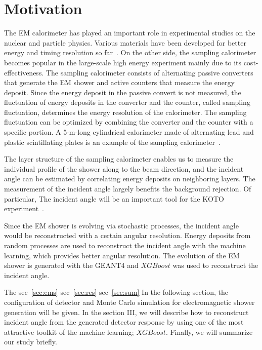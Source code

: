 \documentclass[jkps,preprint,fleqn,showpacs,showkeys]{revtex4}
\newcommand{\XGB}{XGBoost}
\begin{document}
\section{Motivation}
\label{sec:mot}
The EM calorimeter has played an important role in experimental studies on the nuclear and particle physics. Various materials have been developed for better energy and timing resolution so far~\cite{Calorimeter}. On the other side, the sampling calorimeter becomes popular in the large-scale high energy experiment mainly due to its cost-effectiveness. The sampling calorimeter consists of alternating passive converters that generate the EM shower and active counters that measure the energy deposit. Since the energy deposit in the passive convert is not measured, the fluctuation of energy deposits in the converter and the counter, called sampling fluctuation, determines the energy resolution of the  calorimeter. The sampling fluctuation can be optimized by combining the converter and the counter with a specific portion. A 5-m-long cylindrical calorimeter made of alternating lead and plastic scintillating plates is an example of the sampling calorimeter~\cite{E391a_barrel}.

The layer structure of the sampling calorimeter enables us to measure the individual profile of the shower along to the beam direction, and the incident angle can be estimated by correlating energy deposits on neighboring layers. The measurement of the incident angle largely benefits the background rejection. Of particular, The incident angle will be an important tool for the KOTO experiment~\cite{KOTOproposal}.

Since the EM shower is evolving via stochastic processes, the incident angle would be reconstructed with a certain angular resolution. Energy deposits from random processes are used to reconstruct the incident angle with the machine learning, which provides better angular resolution. The evolution of the EM shower is generated with the GEANT4 and $\XGB$ was used to reconstruct the incident angle.

The sec~\ref{sec:ems} sec~\ref{sec:res} sec~\ref{sec:sum}
In the following section, the configuration of detector and Monte Carlo simulation for electromagnetic shower generation will be given. In the section III, we will describe how to reconstruct incident angle from the generated detector response by using one of the most attractive toolkit of the machine learning; $\XGB$. Finally, we will summarize our study briefly.
\end{document}
